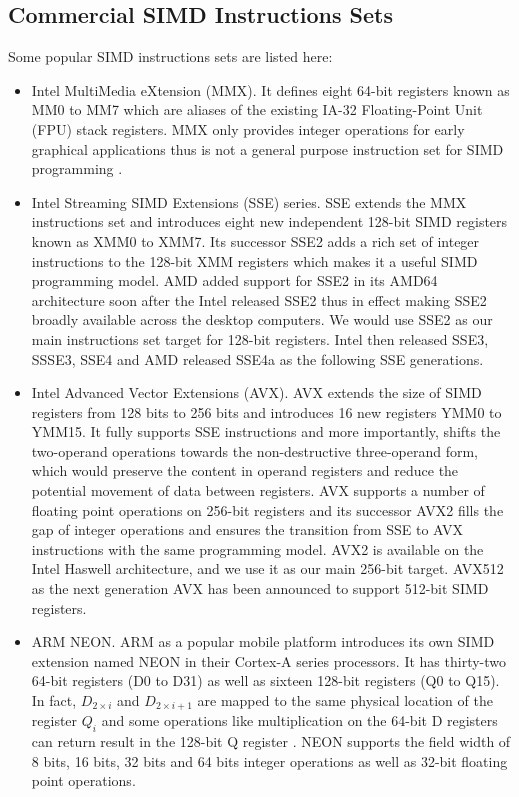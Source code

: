\subsection{Commercial SIMD Instructions Sets}
Some popular SIMD instructions sets are listed here:
\begin{itemize}
  \item Intel MultiMedia eXtension (MMX). It defines eight 64-bit registers known as MM0 to MM7 which are aliases of the existing IA-32 Floating-Point Unit (FPU) stack registers. MMX only provides integer operations for early graphical applications thus is not a general purpose instruction set for SIMD programming \cite{hua_idisa}.
  \item Intel Streaming SIMD Extensions (SSE) series. SSE extends the MMX instructions set and introduces eight new independent 128-bit SIMD registers known as XMM0 to XMM7. Its successor SSE2 adds a rich set of integer instructions to the 128-bit XMM registers which makes it a useful SIMD programming model. AMD added support for SSE2 in its AMD64 architecture soon after the Intel released SSE2 thus in effect making SSE2 broadly available across the desktop computers. We would use SSE2 as our main instructions set target for 128-bit registers. Intel then released SSE3, SSSE3, SSE4 and AMD released SSE4a as the following SSE generations.
  \item Intel Advanced Vector Extensions (AVX). AVX extends the size of SIMD registers from 128 bits to 256 bits and introduces 16 new registers YMM0 to YMM15. It fully supports SSE instructions and more importantly, shifts the two-operand operations towards the non-destructive three-operand form, which would preserve the content in operand registers and reduce the potential movement of data between registers. AVX supports a number of floating point operations on 256-bit registers and its successor AVX2 fills the gap of integer operations and ensures the transition from SSE to AVX instructions with the same programming model. AVX2 is available on the Intel Haswell architecture, and we use it as our main 256-bit target. AVX512 as the next generation AVX has been announced to support 512-bit SIMD registers.
  \item ARM NEON\@. ARM as a popular mobile platform introduces its own SIMD extension named NEON in their Cortex-A series processors. It has thirty-two 64-bit registers (D0 to D31) as well as sixteen 128-bit registers (Q0 to Q15). In fact, $D_{2 \times i}$ and $D_{2 \times i + 1}$ are mapped to the same physical location of the register $Q_i$ and some operations like multiplication on the 64-bit D registers can return result in the 128-bit Q register \cite{hua_idisa}. NEON supports the field width of 8 bits, 16 bits, 32 bits and 64 bits integer operations as well as 32-bit floating point operations.
\end{itemize}


